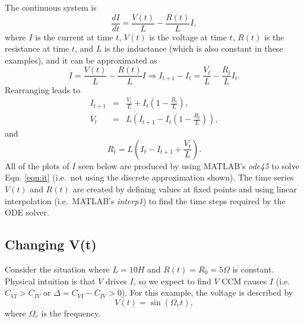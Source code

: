 \documentclass[a4paper,11pt,twocolumn]{article}
\begin{document}
The continuous system is
\begin{equation}
\label{eqn:it}
\frac{dI}{dt} = \frac{V(t)}{L} - \frac{R(t)}{L} I,
\end{equation}
where $I$ is the current at time $t$, $V(t)$ is the voltage at time $t$, $R(t)$ is the resistance at time $t$, and $L$ is the inductance (which is also constant in these examples), and it can be approximated as
\begin{equation}
\dot{I} = \frac{V(t)}{L} - \frac{R(t)}{L} I\Rightarrow I_{t+1}-I_t = \frac{V_t}{L} - \frac{R_t}{L} I_t.
\end{equation}
Rearranging leads to
\begin{eqnarray}
I_{t+1} &=& \frac{V_t}{L}+I_t\left(1-\frac{R_t}{L}\right),\\
V_t &=& L\left(I_{t+1}-I_t\left(1-\frac{R_t}{L}\right)\right),
\end{eqnarray}
and
\begin{equation}
R_t = L\left(I_t-I_{t+1}+\frac{V_t}{L}\right).
\end{equation}
All of the plots of $I$ seen below are produced by using MATLAB's {\em ode45} to solve Eqn. \ref{eqn:it} (i.e.\ not using the discrete approximation shown).  The time series $V(t)$ and $R(t)$ are created by defining values at fixed points and using linear interpolation (i.e.\ MATLAB's {\em interp1}) to find the time steps required by the ODE solver.  

\subsection{Changing V(t)}
Consider the situation where $L=10 H$ and $R(t)=R_0=5\Omega$ is constant.  Physical intuition is that $V$ drives $I$, so we expect to find $V$ CCM causes $I$ (i.e.\ $C_{VI}>C_{IV}$ or $\Delta = C_{VI}-C_{IV} > 0$).  For this example, the voltage is described by 
\begin{equation}
\label{eqn:vt}
V(t) = \sin\left(\Omega_v t\right),
\end{equation}
where $\Omega_v$ is the frequency.
\end{document}
